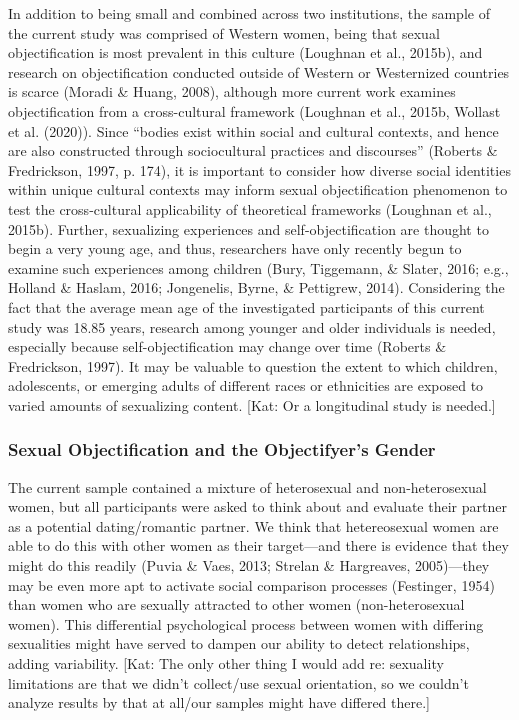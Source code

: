 \documentclass[man]{apa6}
\begin{document}
In addition to being small and combined across two institutions, the
sample of the current study was comprised of Western women, being that
sexual objectification is most prevalent in this culture (Loughnan et
al., 2015b), and research on objectification conducted outside of
Western or Westernized countries is scarce (Moradi \& Huang, 2008),
although more current work examines objectification from a
cross-cultural framework (Loughnan et al., 2015b, Wollast et al.
(2020)). Since \enquote{bodies exist within social and cultural
contexts, and hence are also constructed through sociocultural practices
and discourses} (Roberts \& Fredrickson, 1997, p. 174), it is important
to consider how diverse social identities within unique cultural
contexts may inform sexual objectification phenomenon to test the
cross-cultural applicability of theoretical frameworks (Loughnan et al.,
2015b). Further, sexualizing experiences and self-objectification are
thought to begin a very young age, and thus, researchers have only
recently begun to examine such experiences among children (Bury,
Tiggemann, \& Slater, 2016; e.g., Holland \& Haslam, 2016; Jongenelis,
Byrne, \& Pettigrew, 2014). Considering the fact that the average mean
age of the investigated participants of this current study was 18.85
years, research among younger and older individuals is needed,
especially because self-objectification may change over time (Roberts \&
Fredrickson, 1997). It may be valuable to question the extent to which
children, adolescents, or emerging adults of different races or
ethnicities are exposed to varied amounts of sexualizing content.
{[}Kat: Or a longitudinal study is needed.{]}

\subsubsection{Sexual Objectification and the Objectifyer's
Gender}\label{sexual-objectification-and-the-objectifyers-gender}

The current sample contained a mixture of heterosexual and
non-heterosexual women, but all participants were asked to think about
and evaluate their partner as a potential dating/romantic partner. We
think that hetereosexual women are able to do this with other women as
their target---and there is evidence that they might do this readily
(Puvia \& Vaes, 2013; Strelan \& Hargreaves, 2005)---they may be even
more apt to activate social comparison processes (Festinger, 1954) than
women who are sexually attracted to other women (non-heterosexual
women). This differential psychological process between women with
differing sexualities might have served to dampen our ability to detect
relationships, adding variability. {[}Kat: The only other thing I would
add re: sexuality limitations are that we didn't collect/use sexual
orientation, so we couldn't analyze results by that at all/our samples
might have differed there.{]}
\end{document}
